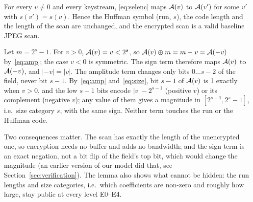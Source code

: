 \begin{lemma}\label{lem:format}
For every $v \ne 0$ and every keystream, \eqref{eq:selenc} maps $\mathcal{A}(v)$ to $\mathcal{A}(v')$ for some $v'$ with $s(v') = s(v)$. Hence the Huffman symbol (run, $s$), the code length and the length of the scan are unchanged, and the encrypted scan is a valid baseline JPEG scan.
\end{lemma}
\begin{IEEEproof}
Let $m = 2^s - 1$. For $v > 0$, $\mathcal{A}(v) = v < 2^s$, so $\mathcal{A}(v) \oplus m = m - v = \mathcal{A}(-v)$ by~\eqref{eq:amp}; the case $v < 0$ is symmetric. The sign term therefore maps $\mathcal{A}(v)$ to $\mathcal{A}(-v)$, and $|{-v}| = |v|$. The amplitude term changes only bits $0 \ldots s-2$ of the field, never bit $s-1$. By~\eqref{eq:amp} and~\eqref{eq:size}, bit $s-1$ of $\mathcal{A}(v)$ is 1 exactly when $v > 0$, and the low $s-1$ bits encode $|v| - 2^{s-1}$ (positive $v$) or its complement (negative $v$); any value of them gives a magnitude in $[2^{s-1}, 2^s - 1]$, i.e.\ size category $s$, with the same sign. Neither term touches the run or the Huffman code.
\end{IEEEproof}
Two consequences matter. The scan has exactly the length of the unencrypted one, so encryption needs no buffer and adds no bandwidth; and the sign term is an exact negation, not a bit flip of the field's top bit, which would change the magnitude (an earlier version of our model did that, see Section~\ref{sec:verification}). The lemma also shows what cannot be hidden: the run lengths and size categories, i.e.\ which coefficients are non-zero and roughly how large, stay public at every level E0--E4.

